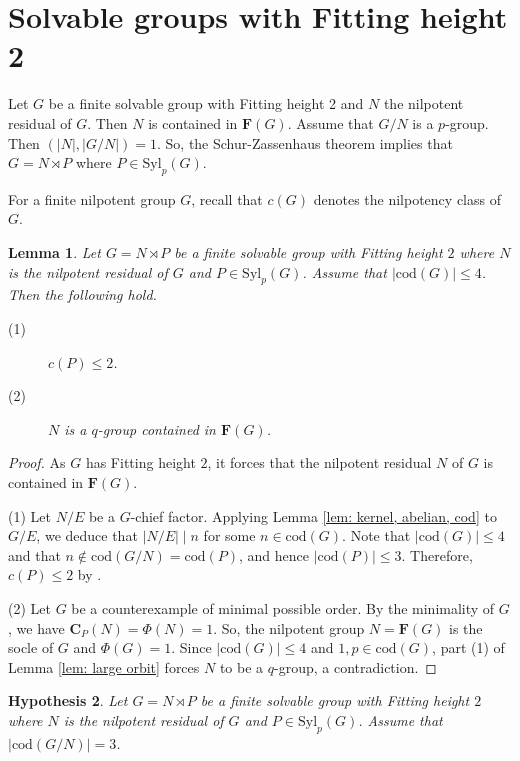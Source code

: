\documentclass[9pt]{article}
\newtheorem{lem}{\bf Lemma}[section]
\newtheorem{hy}[lem]{\bf Hypothesis}
\begin{document}
\section{Solvable groups with Fitting height 2}


Let $G$ be a finite solvable group with Fitting height 2 and $N$ the nilpotent residual of $G$.
Then $N$ is contained in $\mathbf{F}(G)$.
Assume that 
$G/N$ is a $p$-group.
Then $(|N|,|G/N|)=1$.
So, the Schur-Zassenhaus theorem implies that 
$G=N \rtimes P$ where $P\in \mathrm{Syl}_{p}(G)$.

For a finite nilpotent group $G$, recall that $c(G)$ denotes the nilpotency class of $G$.

\begin{lem}\label{lem: |cod(G)|<=4}
	Let $G=N \rtimes P$ be a finite solvable group with Fitting height $2$ where $N$ is the nilpotent residual of $G$ and $P\in \mathrm{Syl}_{p}(G)$.
	Assume that $|\mathrm{cod}(G)|\leq 4$.
	Then the following hold.
	\begin{description}
		\item[(1)] $c(P)\leq 2$.
		\item[(2)] $N$ is a $q$-group contained in $\mathbf{F}(G)$.
	\end{description}
\end{lem}
\begin{proof}
    As $G$ has Fitting height $2$,
	it forces that the nilpotent residual $N$ of $G$ is contained in $\mathbf{F}(G)$.


	(1) Let $N/E$ be a $G$-chief factor.
	Applying Lemma \ref{lem: kernel, abelian, cod} to $G/E$,
    we deduce that $|N/E|\mid n$ for some $n\in \mathrm{cod}(G)$.
	Note that $|\mathrm{cod}(G)|\leq 4$ and that $n\notin \mathrm{cod}(G/N)=\mathrm{cod}(P)$, and hence $|\mathrm{cod}(P)|\leq 3$.
	Therefore, $c(P)\leq 2$ by \cite[Theorem 1.2]{du2016}.

	
 



	
	(2) Let $G$ be a counterexample of minimal possible order.
    By the minimality of $G$, we have $\mathbf{C}_{P}(N)=\Phi(N)=1$.
	So, the nilpotent group $N=\mathbf{F}(G)$ is the socle of $G$ and $\Phi(G)=1$.
	Since $|\mathrm{cod}(G)|\leq 4$ and $1,p\in \mathrm{cod}(G)$,
	part (1) of Lemma \ref{lem: large orbit} forces $N$ to be a $q$-group, a contradiction.
\end{proof}

\begin{hy}\label{hy: height=2, |cod(G/N)|=3}
   Let $G=N \rtimes P$ be a finite solvable group with Fitting height $2$ where $N$ is the nilpotent residual of $G$ and $P\in \mathrm{Syl}_{p}(G)$.
   Assume that $|\mathrm{cod}(G/N)|=3$.
\end{hy}
\end{document}
